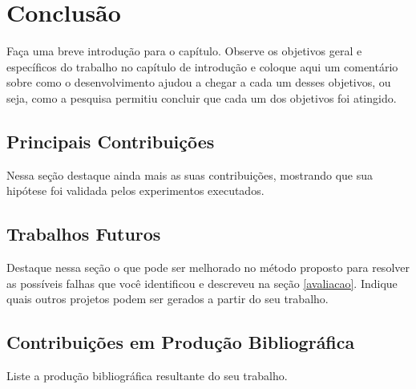 \chapter[Conclusão]{Conclusão}
Faça uma breve introdução para o capítulo. Observe os objetivos geral e específicos do trabalho no capítulo de introdução e coloque aqui um comentário sobre como o desenvolvimento ajudou a chegar a cada um desses objetivos, ou seja, como a pesquisa permitiu concluir que cada um dos objetivos foi atingido.

\section{Principais Contribuições}
Nessa seção destaque ainda mais as suas contribuições, mostrando que sua hipótese foi validada pelos experimentos executados. 

\section{Trabalhos Futuros}
Destaque nessa seção o que pode ser melhorado no método proposto para resolver as possíveis falhas que você identificou e descreveu na seção \ref{avaliacao}. Indique quais outros projetos podem ser gerados a partir do seu trabalho.

\section{Contribuições em Produção Bibliográfica}
Liste a produção bibliográfica resultante do seu trabalho.